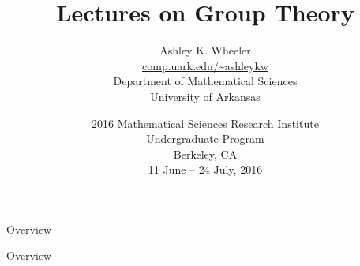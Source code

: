 \documentclass[t,10pt,aspectratio=2516,envcountsect]{beamer}
\title[Group Theory]{
	Lectures on Group Theory 
	}
\subtitle{}
\author[Ashley K. Wheeler]{
	{\large Ashley K. Wheeler} \\
	\vspace{0.5pc}
	{\small
	\url{comp.uark.edu/~ashleykw} \\
	Department of Mathematical Sciences \\
	University of Arkansas}
	}
\institute[UArk]{}
\date[2016 MSRI-UP]{\small
	2016 Mathematical Sciences Research Institute \\
	Undergraduate Program \\
	\smallGap
	Berkeley, CA \\ 
	11 June -- 24 July,  2016 \\
	
	}
\numberwithin{subsection}{section}
\numberwithin{theorem}{subsection}
\numberwithin{equation}{section}
\numberwithin{figure}{section}
\theoremstyle{plain}
\theoremstyle{definition}
\newcommand{\1}{^{-1}}
\newcommand{\smallGap}{\vspace{3pt}}
\begin{document}
{

\begin{frame}
\titlepage
\end{frame}

\begin{frame}{Overview}
\begin{multicols}{2}
\tableofcontents[sections={1-5}]
\end{multicols}
\end{frame}

\begin{frame}{Overview}
\begin{multicols}{2}
\tableofcontents[sections={6-10}]
\end{multicols}
\end{frame}
}












\end{document}
